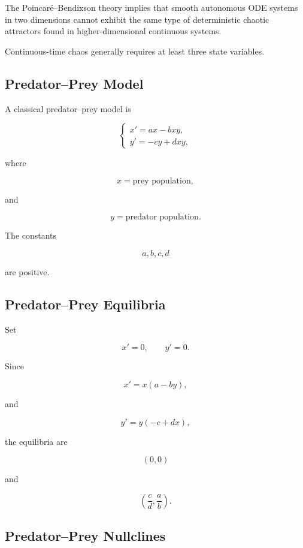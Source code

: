 The Poincaré--Bendixson theory implies that smooth autonomous ODE systems
in two dimensions cannot exhibit the same type of deterministic chaotic
attractors found in higher-dimensional continuous systems.

Continuous-time chaos generally requires at least three state variables.

\subsection{Predator--Prey Model}
\label{subsec:predator-prey}

A classical predator--prey model is

\[
\boxed{
\begin{cases}
x'
=
ax-bxy,
\\
y'
=
-cy+dxy,
\end{cases}
}
\]

where

\[
x
=
\text{prey population},
\]

and

\[
y
=
\text{predator population}.
\]

The constants

\[
a,b,c,d
\]

are positive.

\subsection{Predator--Prey Equilibria}
\label{subsec:predator-prey-equilibria}

Set

\[
x'=0,
\qquad
y'=0.
\]

Since

\[
x'
=
x(a-by),
\]

and

\[
y'
=
y(-c+dx),
\]

the equilibria are

\[
\boxed{
(0,0)
}
\]

and

\[
\boxed{
\left(
\frac{c}{d},
\frac{a}{b}
\right).
}
\]

\subsection{Predator--Prey Nullclines}
\label{subsec:predator-prey-nullclines}

